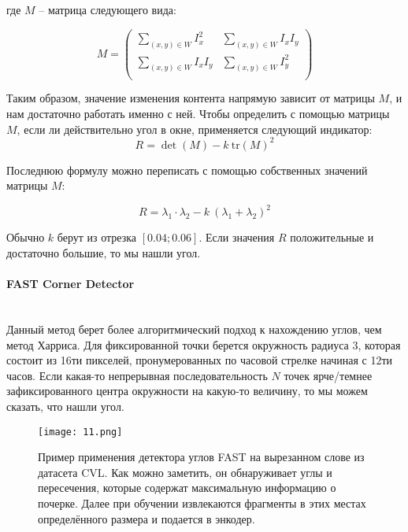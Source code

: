     \smallskip
    \noindent
    где $M$ -- матрица следующего вида:

    $$
    M = \begin{pmatrix}
        \sum_{(x, y) \in W} I^2_x & \sum_{(x, y) \in W} I_x I_y \\
        \sum_{(x, y) \in W} I_x I_y & \sum_{(x, y) \in W} I^2_y \\
    \end{pmatrix}
    $$

    \bigskip
    \noindent

    Таким образом, значение изменения контента напрямую зависит от матрицы $M$, и нам достаточно работать именно с ней. Чтобы определить с помощью матрицы $M$, если ли действительно угол в окне, применяется следующий индикатор:
    $$
        R = \det(M) - k \: \text{tr}(M)^2
    $$
    \noindent

    Последнюю формулу можно переписать с помощью собственных значений матрицы $M$:

    $$
        R = \lambda_1 \cdot \lambda_2 - k \: (\lambda_1 + \lambda_2)^2
    $$
    \noindent

    Обычно $k$ берут из отрезка $[0.04; 0.06]$. Если значения $R$ положительные и достаточно большие, то мы нашли угол. 

    \paragraph{FAST Corner Detector}\mbox{} \\

    Данный метод берет более алгоритмический подход к нахождению углов, чем метод Харриса. Для фиксированной точки берется окружность радиуса 3, которая состоит из 16ти пикселей, пронумерованных по часовой стрелке начиная с 12ти часов. Если какая-то непрерывная последовательность $N$ точек ярче/темнее зафиксированного центра окружности на какую-то величину, то мы можем сказать, что нашли угол. 

    \begin{figure}[htbp]
        \centering
        \texttt{[image: 11.png]}
        \caption{Пример применения детектора углов FAST на вырезанном слове из датасета CVL. Как можно заметить, он обнаруживает углы и пересечения, которые содержат максимальную информацию о почерке. Далее при обучении извлекаются фрагменты в этих местах определённого размера и подается в энкодер.}
        \label{fig:fast_example}
    \end{figure}

